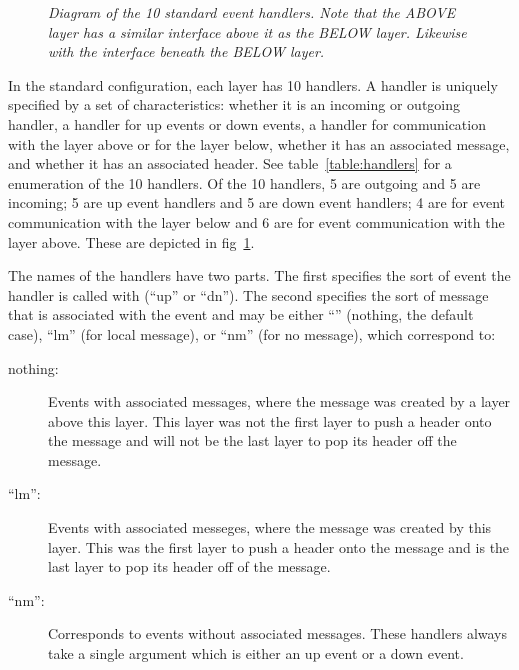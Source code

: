 \begin{figure}[tb]
\begin{center}
\end{center}
\caption{\em Diagram of the 10 standard event handlers.  Note that the
ABOVE layer has a similar interface above it as the BELOW layer.  Likewise
with the interface beneath the BELOW layer.}
\label{fig:handlers}
\end{figure}

In the standard configuration, each layer has 10 handlers.  A handler is
uniquely specified by a set of characteristics: whether it is an incoming
or outgoing handler, a handler for up events or down events, a handler for
communication with the layer above or for the layer below, whether it has
an associated message, and whether it has an associated header.  See
table~\ref{table:handlers} for a enumeration of the 10 handlers.  Of the 10
handlers, 5 are outgoing and 5 are incoming; 5 are up event handlers and 5
are down event handlers; 4 are for event communication with the layer below
and 6 are for event communication with the layer above.  These are depicted
in fig~\ref{fig:handlers}.

The names of the handlers have two parts.  The first specifies the sort of
event the handler is called with (``up'' or ``dn'').  The second specifies
the sort of message that is associated with the event and may be either
``'' (nothing, the default case), ``lm'' (for local message), or ``nm''
(for no message), which correspond to:
\begin{description}
\item
[nothing:] Events with associated messages, where the message was created
by a layer above this layer.  This layer was not the first layer to push a
header onto the message and will not be the last layer to pop its header
off the message.
\item
[``lm'':] Events with associated messeges, where the
message was created by this layer.  This was the first layer to push a
header onto the message and is the last layer to pop its header off of the
message.
\item
[``nm'':] Corresponds to events without associated messages.
These handlers always take a single argument which is either an up event or
a down event.
\end{description}
